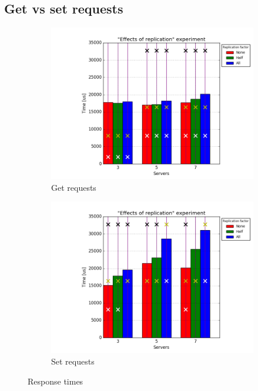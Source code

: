 \documentclass[11pt]{article}
\begin{document}
\subsection{Get vs set requests}
\label{sec:replication-get-set}

\begin{figure}
\centering
\begin{subfigure}{.5\textwidth}
	\centering
	\includegraphics[width=\linewidth]{plots/replication-response_time-get-scaled}
	\caption{Get requests}
\end{subfigure}%
\begin{subfigure}{.5\textwidth}
	\centering
	\includegraphics[width=\linewidth]{plots/replication-response_time-set-scaled}
	\caption{Set requests}
\end{subfigure}
\caption{Response times}
\label{fig:replication-response-time-set-get}
\end{figure}
\end{document}
